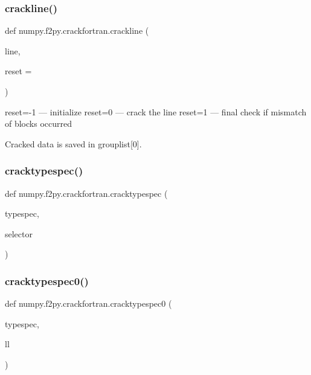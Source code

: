 \mbox{\label{namespacenumpy_1_1f2py_1_1crackfortran_a1efb637a0233ac82842d4ee56de2707d}} 
\subsubsection{\texorpdfstring{crackline()}{crackline()}}
{\footnotesize\ttfamily def numpy.\+f2py.\+crackfortran.\+crackline (\begin{DoxyParamCaption}\item[{}]{line,  }\item[{}]{reset = {} }\end{DoxyParamCaption})}

\begin{DoxyVerb}reset=-1  --- initialize
reset=0   --- crack the line
reset=1   --- final check if mismatch of blocks occurred

Cracked data is saved in grouplist[0].
\end{DoxyVerb}
 \mbox{\label{namespacenumpy_1_1f2py_1_1crackfortran_a9ad33be9024971ccb79915990632432d}} 
\subsubsection{\texorpdfstring{cracktypespec()}{cracktypespec()}}
{\footnotesize\ttfamily def numpy.\+f2py.\+crackfortran.\+cracktypespec (\begin{DoxyParamCaption}\item[{}]{typespec,  }\item[{}]{selector }\end{DoxyParamCaption})}

\mbox{\label{namespacenumpy_1_1f2py_1_1crackfortran_a97466a34f07a6c14e6f1b431492f4b10}} 
\subsubsection{\texorpdfstring{cracktypespec0()}{cracktypespec0()}}
{\footnotesize\ttfamily def numpy.\+f2py.\+crackfortran.\+cracktypespec0 (\begin{DoxyParamCaption}\item[{}]{typespec,  }\item[{}]{ll }\end{DoxyParamCaption})}

